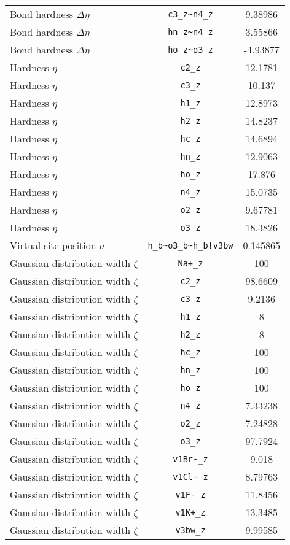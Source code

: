 \begin{table}[ht]
\begin{tabular}{lcc}
Bond hardness $\Delta\eta$ & \verb^c3_z~n4_z^ & 9.38986 \\ 
Bond hardness $\Delta\eta$ & \verb^hn_z~n4_z^ & 3.55866 \\ 
Bond hardness $\Delta\eta$ & \verb^ho_z~o3_z^ & -4.93877 \\ 
Hardness $\eta$ & \verb^c2_z^ & 12.1781 \\ 
Hardness $\eta$ & \verb^c3_z^ & 10.137 \\ 
Hardness $\eta$ & \verb^h1_z^ & 12.8973 \\ 
Hardness $\eta$ & \verb^h2_z^ & 14.8237 \\ 
Hardness $\eta$ & \verb^hc_z^ & 14.6894 \\ 
Hardness $\eta$ & \verb^hn_z^ & 12.9063 \\ 
Hardness $\eta$ & \verb^ho_z^ & 17.876 \\ 
Hardness $\eta$ & \verb^n4_z^ & 15.0735 \\ 
Hardness $\eta$ & \verb^o2_z^ & 9.67781 \\ 
Hardness $\eta$ & \verb^o3_z^ & 18.3826 \\ 
Virtual site position $a$ & \verb^h_b~o3_b~h_b!v3bw^ & 0.145865 \\ 
Gaussian distribution width $\zeta$ & \verb^Na+_z^ & 100 \\ 
Gaussian distribution width $\zeta$ & \verb^c2_z^ & 98.6609 \\ 
Gaussian distribution width $\zeta$ & \verb^c3_z^ & 9.2136 \\ 
Gaussian distribution width $\zeta$ & \verb^h1_z^ & 8 \\ 
Gaussian distribution width $\zeta$ & \verb^h2_z^ & 8 \\ 
Gaussian distribution width $\zeta$ & \verb^hc_z^ & 100 \\ 
Gaussian distribution width $\zeta$ & \verb^hn_z^ & 100 \\ 
Gaussian distribution width $\zeta$ & \verb^ho_z^ & 100 \\ 
Gaussian distribution width $\zeta$ & \verb^n4_z^ & 7.33238 \\ 
Gaussian distribution width $\zeta$ & \verb^o2_z^ & 7.24828 \\ 
Gaussian distribution width $\zeta$ & \verb^o3_z^ & 97.7924 \\ 
Gaussian distribution width $\zeta$ & \verb^v1Br-_z^ & 9.018 \\ 
Gaussian distribution width $\zeta$ & \verb^v1Cl-_z^ & 8.79763 \\ 
Gaussian distribution width $\zeta$ & \verb^v1F-_z^ & 11.8456 \\ 
Gaussian distribution width $\zeta$ & \verb^v1K+_z^ & 13.3485 \\ 
Gaussian distribution width $\zeta$ & \verb^v3bw_z^ & 9.99585 \\ 
\hline
\end{tabular}
\end{table}
